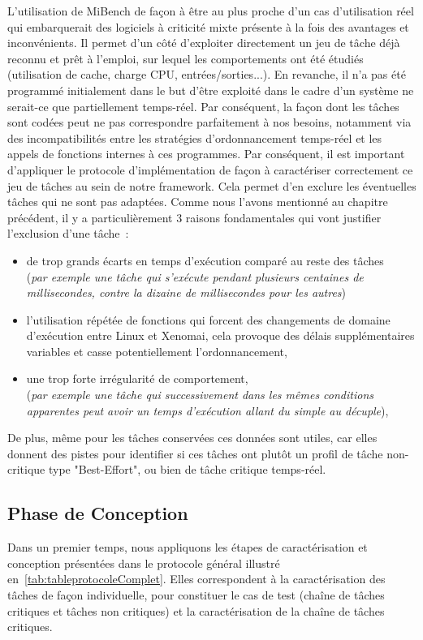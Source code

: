 \documentclass[french, a4paper, 11pt, twoside, pdftex]{StyleThese}
\begin{document}
	L'utilisation de MiBench de façon à être au plus proche d'un cas d'utilisation réel qui embarquerait des logiciels à criticité mixte présente à la fois des avantages et inconvénients. Il permet d'un côté d'exploiter directement un jeu de tâche déjà reconnu et prêt à l'emploi, sur lequel les comportements ont été étudiés (utilisation de cache, charge CPU, entrées/sorties...). En revanche, il n'a pas été programmé initialement dans le but d'être exploité dans le cadre d'un système ne serait-ce que partiellement temps-réel. Par conséquent, la façon dont les tâches sont codées peut ne pas correspondre parfaitement à nos besoins, notamment via des incompatibilités entre les stratégies d'ordonnancement temps-réel et les appels de fonctions internes à ces programmes.
	Par conséquent, il est important d'appliquer le protocole d'implémentation de façon à caractériser correctement ce jeu de tâches au sein de notre framework. Cela permet d'en exclure les éventuelles tâches qui ne sont pas adaptées. Comme nous l'avons mentionné au chapitre précédent, il y a particulièrement 3 raisons fondamentales qui vont justifier l'exclusion d'une tâche~: 
	\begin{itemize}
		\item de trop grands écarts en temps d'exécution comparé au reste des tâches \\
		(\textit{par exemple une tâche qui s'exécute pendant plusieurs centaines de millisecondes, contre la dizaine de millisecondes pour les autres})
		\item l'utilisation répétée de fonctions qui forcent des changements de domaine d'exécution entre Linux et Xenomai, cela provoque des délais supplémentaires variables et casse potentiellement l'ordonnancement,
		\item une trop forte irrégularité de comportement, \\
		(\textit{par exemple une tâche qui successivement dans les mêmes conditions apparentes peut avoir un temps d'exécution allant du simple au décuple}), 
	\end{itemize}
	De plus, même pour les tâches conservées ces données sont utiles, car elles donnent des pistes pour identifier si ces tâches ont plutôt un profil de tâche non-critique type "Best-Effort", ou bien de tâche critique temps-réel. 
	
\subsection{Phase de Conception}
Dans un premier temps, nous appliquons les étapes de caractérisation et conception présentées dans le protocole général illustré en~\autoref{tab:tableprotocoleComplet}. Elles correspondent à la caractérisation des tâches de façon individuelle, pour constituer le cas de test (chaîne de tâches critiques et tâches non critiques) et la caractérisation de la chaîne de tâches critiques.
\end{document}
